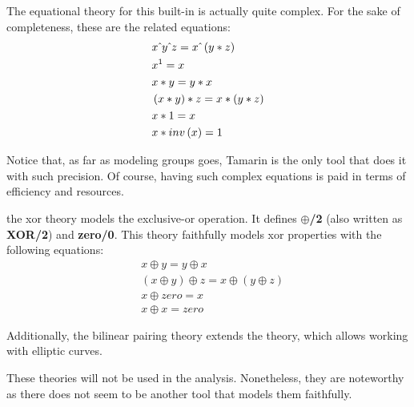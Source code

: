 \begin{description}[style=nextline]
        The equational theory for this built-in is actually quite complex. For the sake of completeness, these are the related equations:
        \begin{equation}
            \begin{aligned}
                 & x \hat{\mkern6mu} y \hat{\mkern6mu} z = x \hat{\mkern6mu} \left(y * z\right) \\
                 & x ^ 1 = x                                         \\
                 & x * y = y * x                                     \\
                 & \left(x * y\right) * z = x * \left(y * z\right)   \\
                 & x * 1 = x                                         \\
                 & x * inv\left(x\right) = 1
            \end{aligned}
        \end{equation}

        Notice that, as far as modeling groups goes, Tamarin is the only tool that does it with such precision. Of course, having such complex equations is paid in terms of efficiency and resources.
    \item[xor and bilinear-pairing] the xor theory models the exclusive-or operation. It defines \textbf{$\oplus$/2} (also written as \textbf{XOR/2}) and \textbf{zero/0}. This theory faithfully models xor properties with the following equations:
        \begin{equation}
            \begin{aligned}
                 & x \oplus y = y \oplus x                                             \\
                 & \left(x \oplus y\right) \oplus z = x \oplus \left(y \oplus z\right) \\
                 & x \oplus zero = x                                                   \\
                 & x \oplus x = zero
            \end{aligned}
        \end{equation}

        Additionally, the bilinear pairing theory extends the \DiHe{} theory, which allows working with elliptic curves.

        These theories will not be used in the analysis. Nonetheless, they are noteworthy as there does not seem to be another tool that models them faithfully.
\end{description}

